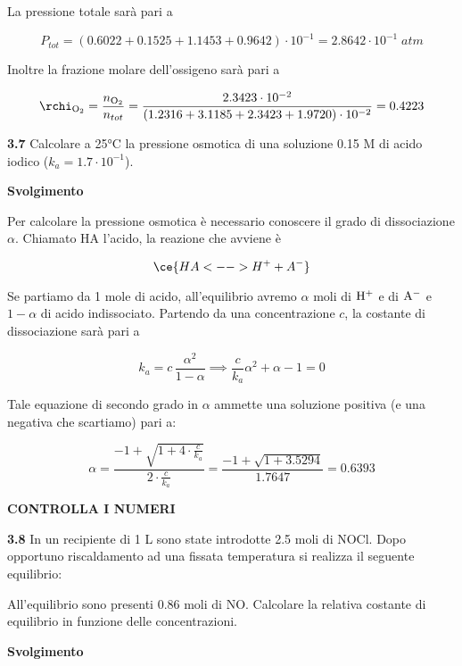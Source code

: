 La pressione totale sarà pari a

$$P_{tot}=(0.6022 + 0.1525 + 1.1453 + 0.9642) \cdot 10^{-1}=2.8642 \cdot 10^{-1}\;atm$$

Inoltre la frazione molare dell'ossigeno sarà pari a

$$\rchi_{\rm O_2}=\frac{n_{\rm O_2}}{n_{tot}}=\frac{2.3423 \cdot 10^{-2}}{(1.2316 + 3.1185 + 2.3423 + 1.9720) \cdot 10^{-2}}=0.4223$$

\vspace{0.2cm}\textbf{3.7} Calcolare a 25°C la pressione osmotica di una soluzione 0.15 M di acido iodico ($k_a=1.7 \cdot 10^{-1}$).

\vspace{0.2cm}\large\textbf{Svolgimento}\normalsize

\vspace{0.2cm}Per calcolare la pressione osmotica è necessario conoscere il grado di dissociazione $\alpha$. Chiamato HA l'acido, la reazione che avviene è

$$\ce{HA <--> H^+ + A^-}$$

Se partiamo da 1 mole di acido, all'equilibrio avremo $\alpha$ moli di $\rm H^+$ e di $\rm A^-$ e $1-\alpha$ di acido indissociato. Partendo da una concentrazione $c$, la costante di dissociazione sarà pari a

$$k_a=c\,\frac{\alpha^2}{1-\alpha}
\implies
\frac{c}{k_a}\alpha^2 + \alpha -1=0$$

Tale equazione di secondo grado in $\alpha$ ammette una soluzione positiva (e una negativa che scartiamo) pari a:

$$\alpha=\frac{-1 + \sqrt{1 + 4 \cdot \displaystyle \frac{c}{k_a}}}{2 \cdot \displaystyle \frac{c}{k_a}}
=\frac{-1 + \sqrt{1 + 3.5294}}{1.7647}=0.6393$$

\textbf{CONTROLLA I NUMERI}

\vspace{0.2cm}\textbf{3.8} In un recipiente di 1 L sono state introdotte 2.5 moli di NOCl. Dopo opportuno riscaldamento ad una fissata temperatura si realizza il seguente equilibrio:

\begin{center}
\end{center}

All'equilibrio sono presenti 0.86 moli di NO. Calcolare la relativa costante di equilibrio in funzione delle concentrazioni.

\vspace{0.2cm}\large\textbf{Svolgimento}\normalsize

